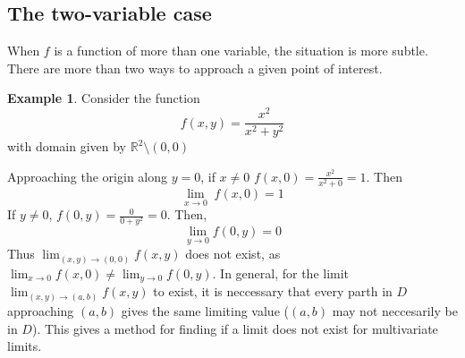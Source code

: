 \documentclass[a6paper]{article}
\theoremstyle{definition}
\newtheorem{example}{Example}
\theoremstyle{plain}
\theoremstyle{remark}
\begin{document}
    \subsection{The two-variable case}
    When $ f $ is a function of more than one variable, the situation is more
    subtle. There are more than two ways to approach a given point of interest.
    \begin{example}
    Consider the function
    $$ f(x,y) = \frac{x^2}{x^2 + y^2} $$
    with domain given by $ \mathbb{R}^2 \setminus {(0,0)} $
    \end{example}
    Approaching the origin along $ y = 0 $, if $ x \neq 0  $ $ f(x,0)
    = \displaystyle \frac{x^2}{x^2 + 0} = 1$. Then 
    $$ \lim_{x\to 0} \; f(x,0) = 1 $$
    If $ y \neq 0  $, $ f(0,y) = \displaystyle \frac{0}{0+y^2} = 0 $. Then,
    $$ \lim_{y \to 0}  f(0,y) = 0 $$
    Thus $ \displaystyle \lim_{(x,y) \to (0,0)} f(x,y) $ does not exist, as
    $ \displaystyle \lim_{x\to 0} f(x,0) \neq \displaystyle \lim_{y\to 0}
    f(0,y) $. In general, for the limit $ \displaystyle \lim_{(x,y) \to (a,b)}
    f(x,y)$ to exist, it is neccessary that every parth in $ D $ approaching
    $ (a,b) $ gives the same limiting value ($ (a,b) $ may not neccesarily be
    in $ D $). This gives a method for finding if a limit does not exist for
    multivariate limits.
\end{document}
